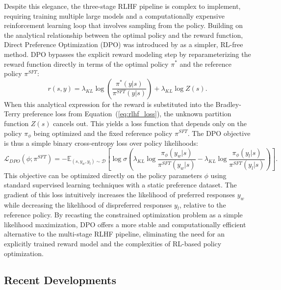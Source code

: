 Despite this elegance, the three-stage RLHF pipeline is complex to implement, requiring training multiple large models and a computationally expensive reinforcement learning loop that involves sampling from the policy. Building on the analytical relationship between the optimal policy and the reward function, Direct Preference Optimization (DPO) was introduced by \citet{rafailov2023direct} as a simpler, RL-free method. DPO bypasses the explicit reward modeling step by reparameterizing the reward function directly in terms of the optimal policy $\pi^*$ and the reference policy $\pi^{SFT}$:
\begin{equation}
    r(s,y) = \lambda_{KL} \log\left(\frac{\pi^*(y|s)}{\pi^{SFT}(y|s)}\right) + \lambda_{KL} \log Z(s).
\label{eq:dpo_reparameterize}
\end{equation}
When this analytical expression for the reward is substituted into the Bradley-Terry preference loss from Equation~(\ref{eq:rlhf_loss}), the unknown partition function $Z(s)$ cancels out. This yields a loss function that depends only on the policy $\pi_\phi$ being optimized and the fixed reference policy $\pi^{SFT}$. The DPO objective is thus a simple binary cross-entropy loss over policy likelihoods:
\begin{equation}
    \mathcal{L}_{DPO}(\phi; \pi^{SFT}) = -\mathbb{E}_{(s, y_w, y_l) \sim \mathcal{D}} \left[ \log \sigma \left( \lambda_{KL} \log \frac{\pi_\phi(y_w|s)}{\pi^{SFT}(y_w|s)} - \lambda_{KL} \log \frac{\pi_\phi(y_l|s)}{\pi^{SFT}(y_l|s)} \right) \right].
\label{eq:dpo_loss}
\end{equation}
This objective can be optimized directly on the policy parameters $\phi$ using standard supervised learning techniques with a static preference dataset. The gradient of this loss intuitively increases the likelihood of preferred responses $y_w$ while decreasing the likelihood of dispreferred responses $y_l$, relative to the reference policy. By recasting the constrained optimization problem as a simple likelihood maximization, DPO offers a more stable and computationally efficient alternative to the multi-stage RLHF pipeline, eliminating the need for an explicitly trained reward model and the complexities of RL-based policy optimization.

\subsection{Recent Developments}

